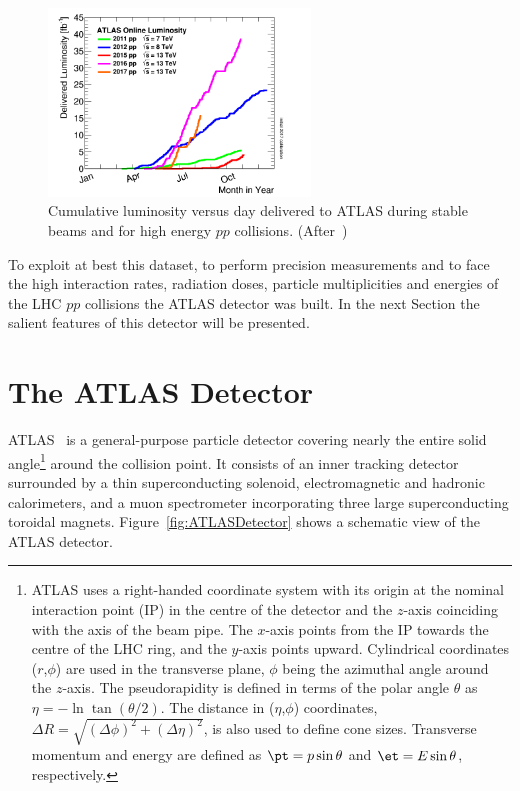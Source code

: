 \begin{figure}[!htpb]
\centering
\includegraphics[width=0.62\textwidth]{intlumivsyear.png}
\caption{\label{fig:intlumivsyear}Cumulative luminosity versus day delivered to ATLAS during stable 
beams and for high energy $pp$ collisions. (After~\cite{ATLASLumi})}
\end{figure}

To exploit at best this dataset, to perform precision measurements 
and to face the high interaction rates, radiation doses, particle multiplicities and energies of the
LHC $pp$ collisions the ATLAS detector was built. In the next Section the salient features of this 
detector will be presented.

\section{The ATLAS Detector}
\label{sec:ATLASDetector}
ATLAS~\cite{AtlasDetector} is a general-purpose particle detector covering nearly the entire solid 
angle\footnote{ATLAS uses a right-handed coordinate system with its origin at the nominal interaction 
point (IP) in the centre of the detector and the $z$-axis coinciding with the axis of the beam pipe.  The 
$x$-axis points from the IP towards the centre of the LHC ring, and the $y$-axis points upward. 
Cylindrical coordinates ($r$,$\phi$) are used in the transverse plane, $\phi$ being the azimuthal angle 
around the $z$-axis. The pseudorapidity is defined in terms of the polar angle $\theta$ as $\eta = - \ln 
\tan(\theta/2)$. The distance in ($\eta$,$\phi$) coordinates, $\Delta R = \sqrt{(\Delta\phi)^2+
(\Delta\eta)^2}$, is also used to define cone sizes. Transverse momentum and energy are defined as $
\pt=p\sin\theta$ and $\et=E\sin\theta$, respectively.} around the collision point. It consists of an inner 
tracking detector surrounded by a thin superconducting solenoid, electromagnetic and hadronic 
calorimeters,
and a muon spectrometer incorporating three large superconducting toroidal magnets. 
Figure~\ref{fig:ATLASDetector} shows a schematic view of the ATLAS detector.

